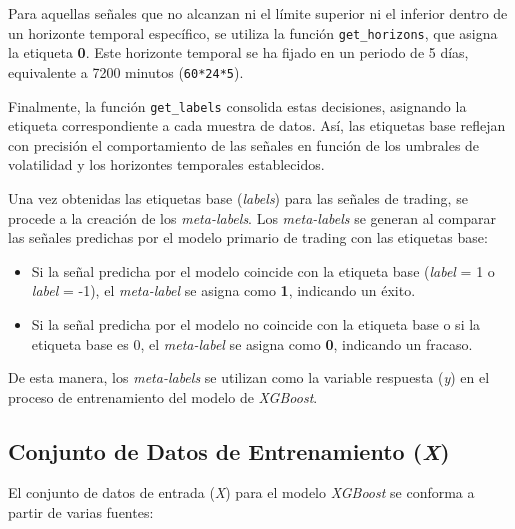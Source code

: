 \documentclass[a4paper,12pt, twoside]{report}
\begin{document}
Para aquellas señales que no alcanzan ni el límite superior ni el inferior dentro 
de un horizonte temporal específico, se utiliza la función \texttt{get\_horizons}, 
que asigna la etiqueta \textbf{0}. Este horizonte temporal se ha fijado en un 
periodo de 5 días, equivalente a 7200 minutos (\texttt{60*24*5}).

Finalmente, la función \texttt{get\_labels} consolida estas decisiones, asignando 
la etiqueta correspondiente a cada muestra de datos. Así, las etiquetas base 
reflejan con precisión el comportamiento de las señales en función de los umbrales 
de volatilidad y los horizontes temporales establecidos.

Una vez obtenidas las etiquetas base (\textit{labels}) para las señales de trading, se procede a la creación de los \textit{meta-labels}. Los \textit{meta-labels} se generan al comparar las señales predichas por el modelo primario de trading con las etiquetas base:

\begin{itemize}
    \item Si la señal predicha por el modelo coincide con la etiqueta base (\textit{label} = 1 o \textit{label} = -1), el \textit{meta-label} se asigna como \textbf{1}, indicando un éxito.
    \item Si la señal predicha por el modelo no coincide con la etiqueta base o si la etiqueta base es 0, el \textit{meta-label} se asigna como \textbf{0}, indicando un fracaso.
\end{itemize}

De esta manera, los \textit{meta-labels} se utilizan como la variable respuesta (\textit{y}) en el proceso de entrenamiento del modelo de \textit{XGBoost}.

\subsection{Conjunto de Datos de Entrenamiento (\textit{X})}

El conjunto de datos de entrada (\textit{X}) para el modelo \textit{XGBoost} se conforma a 
partir de varias fuentes:
\end{document}

